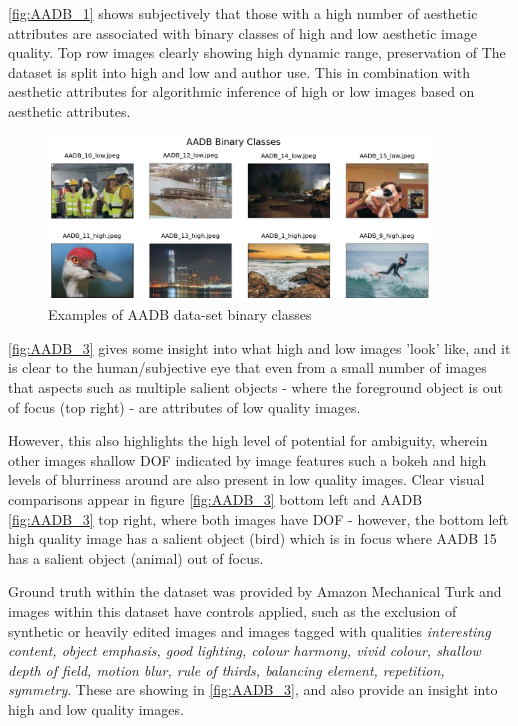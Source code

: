 \ref{fig:AADB_1} shows subjectively that those with a high number of aesthetic attributes are associated with binary classes of high and low aesthetic image quality. Top row images clearly showing high dynamic range, preservation of The dataset is split into high and low and author use. This in combination with aesthetic attributes for algorithmic inference of high or low images based on aesthetic attributes. 

\begin{figure}[hp]
\centering
 \includegraphics[width=0.9\textwidth]{figures/database_ims/AADB_1.png}
  \caption{\label{fig:AADB_3} Examples of AADB data-set binary classes}
  \label{fig:AADB3}
\end{figure}


\ref{fig:AADB_3} gives some insight into what high and low images 'look' like, and it is clear to the human/subjective eye that even from a small number of images that aspects such as multiple salient objects - where the foreground object is out of focus (top right) - are attributes of low quality images. 

However, this also highlights the high level of potential for ambiguity, wherein other images shallow DOF indicated by image features such a bokeh and high levels of blurriness around are also present in low quality images. Clear visual comparisons appear in figure \ref{fig:AADB_3} bottom left and AADB \ref{fig:AADB_3} top right, where both images have DOF - however, the bottom left high quality image has a salient object (bird) which is in focus where AADB 15 has a salient object (animal) out of focus. 

Ground truth within the dataset was provided by Amazon Mechanical Turk and images within this dataset have controls applied, such as the exclusion of synthetic or heavily edited images and images tagged with qualities \textit{interesting content, object emphasis, good lighting, colour harmony, vivid colour, shallow depth of field, motion blur, rule of thirds, balancing element, repetition,  symmetry}. These are showing in \ref{fig:AADB_3}, and also provide an insight into high and low quality images. 





